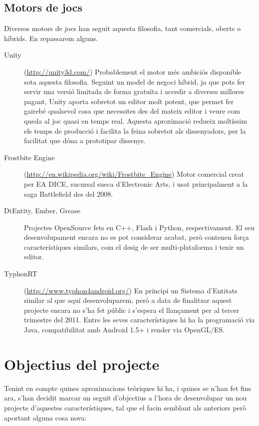 \subsection{Motors de jocs}

Diversos motors de jocs han seguit aquesta filosofia, tant comercials, oberts o híbrids. En repassarem alguns.

\begin{description}
  \item[Unity] (\url{http://unity3d.com/}) Probablement el motor més ambiciós disponible sota aquesta filosofia. Seguint un model de negoci híbrid, ja que pots fer servir una versió limitada de forma gratuïta i accedir a diverses millores pagant, Unity aporta sobretot un editor molt potent, que permet fer gairebé qualsevol cosa que necessites des del mateix editor i veure com queda al joc quasi en temps real. Aquesta aproximació redueix moltíssim els temps de producció i facilita la feina sobretot als dissenyadors, per la facilitat que dóna a prototipar dissenys.
    
  \item[Frostbite Engine] (\url{http://en.wikipedia.org/wiki/Frostbite_Engine}) Motor comercial creat per EA DICE, sucursal sueca d'Electronic Arts, i usat principalment a la saga Battlefield des del 2008.
    
  \item[DtEntity, Ember, Grease] \citep{EntityWiki} Projectes OpenSource fets en C++, Flash i Python, respectivament. El seu desenvolupament encara no es pot considerar acabat, però contenen força característiques similars, com el desig de ser multi-plataforma i tenir un editor.
    
  \item[TyphonRT] (\url{http://www.typhon4android.org/}) En principi un Sistema d'Entitats similar al que aquí desenvoluparem, però a data de finalitzar aquest projecte encara no s'ha fet públic i s'espera el llançament per al tercer trimestre del 2011. Entre les seves característiques hi ha la programació via Java, compatibilitat amb Android 1.5+ i render via OpenGL/ES.
  
\end{description}

\section{Objectius del projecte}

Tenint en compte quines aproximacions teòriques hi ha, i quines se n'han fet fins ara, s'han decidit marcar un seguit d'objectius a l'hora de desenvolupar un nou projecte d'aquestes característiques, tal que el facin semblant als anteriors però aportant alguna cosa nova:

